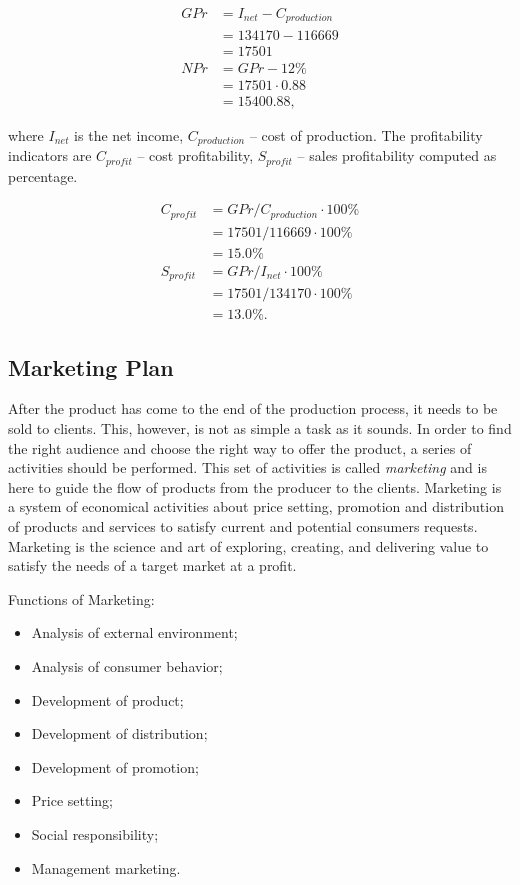 \begin{equation}
 \begin{split}
GPr &= I_{net} - C_{production}\\
    &= 134170 - 116669\\
    &= 17501 \\
NPr &= GPr - 12\% \\
    &= 17501 \cdot 0.88 \\
    &= 15400.88,
\end{split}
\end{equation}

\noindent where $I_{net}$ is the net income, $C_{production}$ -- cost of
production. The profitability indicators are $C_{profit}$ -- cost
profitability, $S_{profit}$ -- sales profitability computed as percentage.

\begin{equation}
 \begin{split}
  C_{profit} &= GPr / C_{production} \cdot 100\%\\
              &= 17501 / 116669 \cdot 100\% \\
              &= 15.0 \%\\
  S_{profit} &= GPr / I_{net} \cdot 100\% \\
             &= 17501 / 134170 \cdot 100\% \\
             &= 13.0 \%.
 \end{split}
\end{equation}

\subsection{Marketing Plan}

After the product has come to the end of the production process, it needs to
be sold to clients. This, however, is not as simple a task as it sounds. In
order to find the right audience and choose the right way to offer the
product, a series of activities should be performed. This set of activities is
called \emph{marketing} and is here to guide the flow of products from the
producer to the clients. Marketing is a system of economical activities about
price setting, promotion and distribution of products and services to satisfy
current and potential consumers requests. Marketing is the science and art of
exploring, creating, and delivering value to satisfy the needs of a target
market at a profit.

Functions of Marketing:
\begin{itemize}
    \item Analysis of external environment;
    \item Analysis of consumer behavior;
    \item Development of product;
    \item Development of distribution;
    \item Development of promotion;
    \item Price setting;
    \item Social responsibility;
    \item Management marketing.
\end{itemize}

